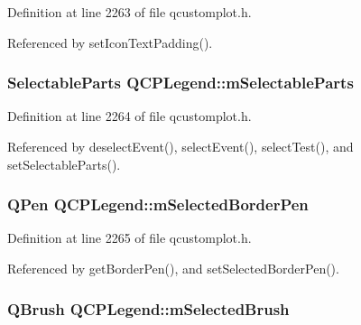 Definition at line 2263 of file qcustomplot.\+h.



Referenced by set\+Icon\+Text\+Padding().

\hypertarget{class_q_c_p_legend_a179b4d5c1bea723b76e402ff48f0d7fb}{}
\subsubsection[{m\+Selectable\+Parts}]{\setlength{\rightskip}{0pt plus 5cm}Selectable\+Parts Q\+C\+P\+Legend\+::m\+Selectable\+Parts\hspace{0.3cm}{\ttfamily [protected]}}\label{class_q_c_p_legend_a179b4d5c1bea723b76e402ff48f0d7fb}


Definition at line 2264 of file qcustomplot.\+h.



Referenced by deselect\+Event(), select\+Event(), select\+Test(), and set\+Selectable\+Parts().

\hypertarget{class_q_c_p_legend_a62906c996906ae23e9f724b6ac1f7334}{}
\subsubsection[{m\+Selected\+Border\+Pen}]{\setlength{\rightskip}{0pt plus 5cm}Q\+Pen Q\+C\+P\+Legend\+::m\+Selected\+Border\+Pen\hspace{0.3cm}{\ttfamily [protected]}}\label{class_q_c_p_legend_a62906c996906ae23e9f724b6ac1f7334}


Definition at line 2265 of file qcustomplot.\+h.



Referenced by get\+Border\+Pen(), and set\+Selected\+Border\+Pen().

\hypertarget{class_q_c_p_legend_ab3c7567c86d4784b1e48f76a84b3a1e2}{}
\subsubsection[{m\+Selected\+Brush}]{\setlength{\rightskip}{0pt plus 5cm}Q\+Brush Q\+C\+P\+Legend\+::m\+Selected\+Brush\hspace{0.3cm}{\ttfamily [protected]}}\label{class_q_c_p_legend_ab3c7567c86d4784b1e48f76a84b3a1e2}


